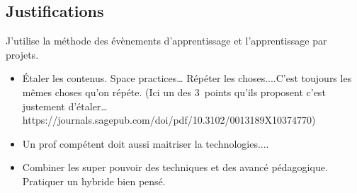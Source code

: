 \clearpage
\subsection{Justifications}

J'utilise la méthode des évènements d’apprentissage\cite{Leclercqevenements} et l'apprentissage par projets\cite{proulx2004apprentissage}.
\begin{itemize}
    \item Étaler les contenus. Space practices… Répéter les choses....C'est toujours les mêmes choses qu'on répéte. (Ici un des 3~points qu'ils proposent c'est justement d'étaler… https://journals.sagepub.com/doi/pdf/10.3102/0013189X10374770)
    \item Un prof compétent doit aussi maitriser la technologies....
    \item Combiner les super pouvoir des techniques et des avancé pédagogique. Pratiquer un hybride bien pensé.



\end{itemize}
